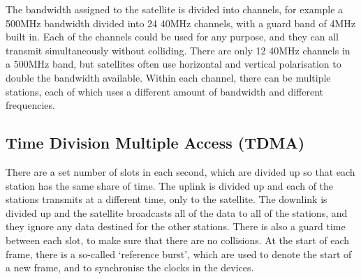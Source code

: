 The bandwidth assigned to the satellite is divided into channels, for example a 500MHz bandwidth divided into 24 40MHz
 channels, with a guard band of 4MHz built in. Each of the channels could be used for any purpose, and they can all
 transmit simultaneously without colliding. There are only 12 40MHz channels in a 500MHz band, but satellites often use
 horizontal and vertical polarisation to double the bandwidth available. Within each channel, there can be multiple
 stations, each of which uses a different amount of bandwidth and different frequencies.

\subsection*{Time Division Multiple Access (TDMA)}

There are a set number of slots in each second, which are divided up so that each station has the same share of time.
 The uplink is divided up and each of the stations transmits at a different time, only to the satellite. The downlink
 is divided up and the satellite broadcasts all of the data to all of the stations, and they ignore any data destined
 for the other stations. There is also a guard time between each slot, to make sure that there are no collisions. At the
 start of each frame, there is a so-called `reference burst', which are used to denote the start of a new frame, and to
 synchronise the clocks in the devices.

